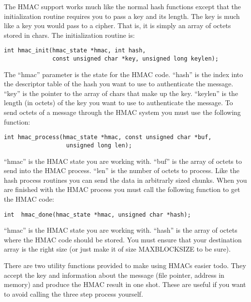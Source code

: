 \documentclass{book}
\begin{document}
The HMAC support works much like the normal hash functions except that the initialization routine requires you to pass a key 
and its length.  The key is much like a key you would pass to a cipher.  That is, it is simply an array of octets stored in
chars.  The initialization routine is:
\begin{verbatim}
int hmac_init(hmac_state *hmac, int hash, 
              const unsigned char *key, unsigned long keylen);
\end{verbatim}
The ``hmac'' parameter is the state for the HMAC code.  ``hash'' is the index into the descriptor table of the hash you want
to use to authenticate the message.  ``key'' is the pointer to the array of chars that make up the key.  ``keylen'' is the
length (in octets) of the key you want to use to authenticate the message.  To send octets of a message through the HMAC system you must use the following function:
\begin{verbatim}
int hmac_process(hmac_state *hmac, const unsigned char *buf,
                  unsigned long len);
\end{verbatim}
``hmac'' is the HMAC state you are working with. ``buf'' is the array of octets to send into the HMAC process.  ``len'' is the
number of octets to process.  Like the hash process routines you can send the data in arbitrarly sized chunks. When you 
are finished with the HMAC process you must call the following function to get the HMAC code:
\begin{verbatim}
int  hmac_done(hmac_state *hmac, unsigned char *hash);
\end{verbatim}
``hmac'' is the HMAC state you are working with.  ``hash'' is the array of octets where the HMAC code should be stored.  You
must ensure that your destination array is the right size (or just make it of size MAXBLOCKSIZE to be sure).  

There are two  utility functions provided to make using HMACs easier todo.  They accept the key and information about the
message (file pointer, address in memory) and produce the HMAC result in one shot.  These are useful if you want to avoid
calling the three step process yourself.
\end{document}
